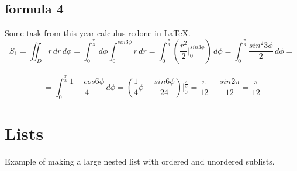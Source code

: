 \documentclass[a4paper, 12pt]{article}
\begin{document}
\subsection{formula 4}
Some task from this year calculus redone in LaTeX.
\large
$$S_1 = \iint_{D}r\,dr\,d\phi=\int_{0}^{\frac{\pi}{3}}\,d\phi\int_{0}^{sin 3\phi}r\,dr=\int_{0}^{\frac{\pi}{3}}(\frac{r^2}{2}\bigg|_{0}^{sin3\phi})\,d\phi=\int_{0}^{\frac{\pi}{3}} \frac{sin^2 3\phi}{2}\,d\phi=$$\\
$$=\int_{0}^{\frac{\pi}{3}} \frac{1-cos6\phi}{4}\,d\phi=(\frac{1}{4}\phi-\frac{sin6\phi}{24})\bigg|_{0}^{\frac{\pi}{3}}=\frac{\pi}{12}-\frac{sin2\pi}{12}=\frac{\pi}{12}$$
\normalsize
\newpage

\section{Lists}
Example of making a large nested list with ordered and unordered sublists.
\end{document}
